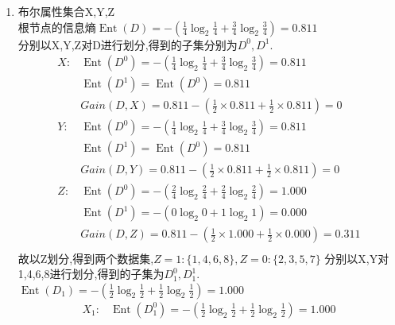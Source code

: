 \documentclass[answers]{exam}  %
\begin{document}
\begin{questions}
    \begin{solution}
        \begin{enumerate}
            \item 布尔属性集合{X,Y,Z}\\
                  根节点的信息熵$\operatorname{Ent}(D)=-(\frac{1}{4} \log_2 \frac{1}{4} +\frac{3}{4} \log_2 \frac{3}{4} )=0.811$\\
                  分别以X,Y,Z对D进行划分,得到的子集分别为$D^0,D^1$.\\
                  \begin{align*}
                      X: & \operatorname{Ent}(D^0)=-(\frac{1}{4} \log_2 \frac{1}{4} +\frac{3}{4} \log_2 \frac{3}{4} )=0.811 \\
                         & \operatorname{Ent}(D^1)=\operatorname{Ent}(D^0)=0.811                                            \\
                         & Gain(D,X)=0.811-(\frac{1}{2} \times 0.811+\frac{1}{2} \times 0.811)=0                            \\
                      Y: & \operatorname{Ent}(D^0)=-(\frac{1}{4} \log_2 \frac{1}{4} +\frac{3}{4} \log_2 \frac{3}{4} )=0.811 \\
                         & \operatorname{Ent}(D^1)=\operatorname{Ent}(D^0)=0.811                                            \\
                         & Gain(D,Y)=0.811-(\frac{1}{2} \times 0.811+\frac{1}{2} \times 0.811)=0                            \\
                      Z: & \operatorname{Ent}(D^0)=-(\frac{2}{4} \log_2 \frac{2}{4} +\frac{2}{4} \log_2 \frac{2}{4} )=1.000 \\
                         & \operatorname{Ent}(D^1)=-(0\log_2 0+1\log_2 1)=0.000                                             \\
                         & Gain(D,Z)=0.811-(\frac{1}{2} \times 1.000+\frac{1}{2} \times 0.000)=0.311                        \\
                  \end{align*}
                  故以Z划分,得到两个数据集,$Z=1:\{1,4,6,8\},Z=0:\{2,3,5,7\}$
                  分别以X,Y对{1,4,6,8}进行划分,得到的子集为$D_1^0,D_1^1$.\\
                  $\operatorname{Ent}(D_1)=-(\frac{1}{2} \log_2 \frac{1}{2} +\frac{1}{2} \log_2 \frac{1}{2} )=1.000$
                  \begin{align*}
                      X_1: & \operatorname{Ent}(D_1^0)=-(\frac{1}{2} \log_2 \frac{1}{2} +\frac{1}{2} \log_2 \frac{1}{2} )=1.000 \\

\end{align*}
\end{enumerate}
\end{solution}
\end{questions}
\end{document}
